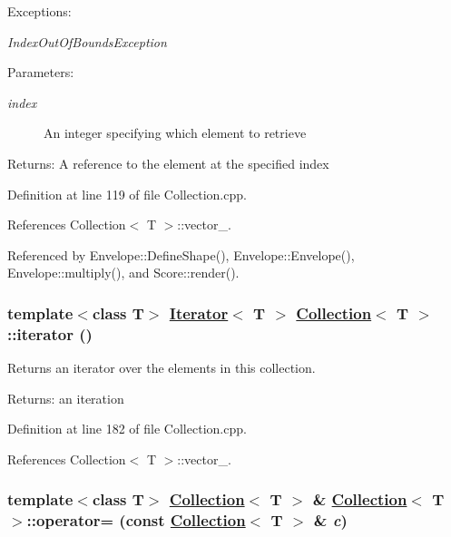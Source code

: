 \begin{Desc}
\item[Exceptions:]
\begin{description}
\item[{\em Index\-Out\-Of\-Bounds\-Exception}]\end{description}
\end{Desc}
\begin{Desc}
\item[Parameters:]
\begin{description}
\item[{\em index}]An integer specifying which element to retrieve \end{description}
\end{Desc}
\begin{Desc}
\item[Returns:]A reference to the element at the specified index \end{Desc}


Definition at line 119 of file Collection.cpp.

References Collection$<$ T $>$::vector\_\-.

Referenced by Envelope::Define\-Shape(), Envelope::Envelope(), Envelope::multiply(), and Score::render().\hypertarget{classCollection_a12}{
\subsubsection[iterator]{\setlength{\rightskip}{0pt plus 5cm}template$<$class T$>$ \hyperlink{classIterator}{Iterator}$<$ T $>$ \hyperlink{classCollection}{Collection}$<$ T $>$::iterator ()}}
\label{classCollection_a12}


Returns an iterator over the elements in this collection. \begin{Desc}
\item[Returns:]an iteration \end{Desc}


Definition at line 182 of file Collection.cpp.

References Collection$<$ T $>$::vector\_\-.\hypertarget{classCollection_a3}{
\subsubsection[operator=]{\setlength{\rightskip}{0pt plus 5cm}template$<$class T$>$ \hyperlink{classCollection}{Collection}$<$ T $>$ \& \hyperlink{classCollection}{Collection}$<$ T $>$::operator= (const \hyperlink{classCollection}{Collection}$<$ T $>$ \& {\em c})}}
\label{classCollection_a3}


